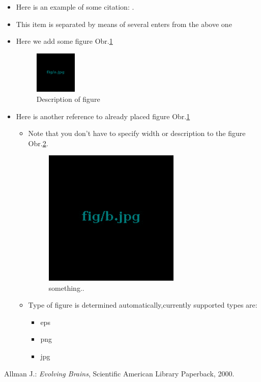 \documentclass[journal,onecolumn]{IEEEtrancz}
\begin{document}
\begin{itemize}
	\item Here is an example of some citation: \cite{kniha}.
		\vspace{3mm}
		\vspace{3mm}
	\item This item is separated by means of several enters from the above one
	\item Here we add some figure Obr.\ref{a} 

	\begin{figure}[ht]
		\centering
			\includegraphics[width=2.0cm]{fig/a.jpg}
		\caption{Description of figure}
		\label{a}
	\end{figure}

	\item Here is another reference to already placed figure Obr.\ref{a} 
	\begin{itemize}
		\item Note that you don't have to specify width or description to the figure Obr.\ref{b}.

		\begin{figure}[ht]
			\centering
				\includegraphics[width=6.5cm]{fig/b.jpg}
			\caption{ something..}
			\label{b}
		\end{figure}

		\item Type of figure is determined automatically,currently supported types are:
		\begin{itemize}
			\item eps
			\item png
			\item jpg


\end{itemize}
	\end{itemize}
\end{itemize}
\begin{literatura}{1}

Allman J.: \emph{Evolving Brains}, Scientific American Library Paperback, 2000.
\end{literatura}
\end{document}
